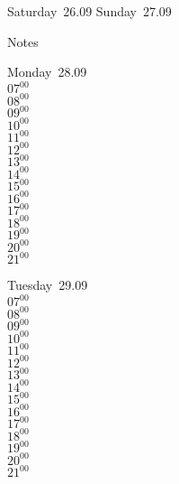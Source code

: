 \documentclass[11pt,a4paper]{book}\usepackage[]{graphicx}\usepackage[]{color}
\begin{document}
\begin{weekendbox}
  Saturday~26.09
  \tcblower
  Sunday~27.09
\end{weekendbox} %
\begin{notebox}
  Notes
\end{notebox}
\clearpage
\begin{headerbox}
\end{headerbox}
\begin{weekdaybox}
  Monday~28.09\\
  { 
  \vfill
  $07^{00}$\\
$08^{00}$\\
$09^{00}$\\
$10^{00}$\\
$11^{00}$\\
$12^{00}$\\
$13^{00}$\\
$14^{00}$\\
$15^{00}$\\
$16^{00}$\\
$17^{00}$\\
$18^{00}$\\
$19^{00}$\\
$20^{00}$\\
$21^{00}$\\
  }
\end{weekdaybox}
\begin{weekdaybox}
  Tuesday~29.09\\
  { 
  \vfill
  $07^{00}$\\
$08^{00}$\\
$09^{00}$\\
$10^{00}$\\
$11^{00}$\\
$12^{00}$\\
$13^{00}$\\
$14^{00}$\\
$15^{00}$\\
$16^{00}$\\
$17^{00}$\\
$18^{00}$\\
$19^{00}$\\
$20^{00}$\\
$21^{00}$\\
  }
\end{weekdaybox}
\end{document}
